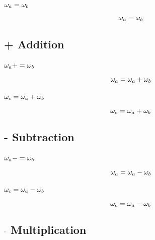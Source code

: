 \subsubsection*{$\ra a = \ra b$}
\begin{equation}
\ra a = \ra b
\end{equation}



\subsection{+ Addition}
\subsubsection*{$\ra a += \ra b$}
\begin{equation}
\ra a = \ra a + \ra b
\end{equation}

\subsubsection*{$\ra c = \ra a + \ra b$}
\begin{equation}
\ra c = \ra a + \ra b
\end{equation}



\subsection{- Subtraction}
\subsubsection*{$\ra a -= \ra b$}
\begin{equation}
\ra a = \ra a - \ra b
\end{equation}

\subsubsection*{$\ra c = \ra a - \ra b$}
\begin{equation}
\ra c = \ra a - \ra b
\end{equation}



\subsection{$\multiplication$ Multiplication}
